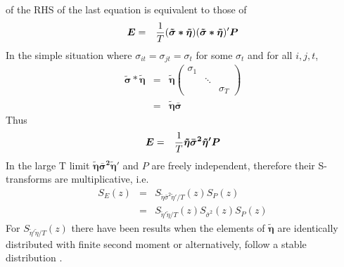 \documentclass{article}
\begin{document}
of the RHS of the last equation is equivalent to those of
\begin{eqnarray*}
  \bm E &=& {1 \over T} (\bm{\tilde{\sigma} * \tilde{\eta}}) (\bm{\tilde{\sigma}
    * \tilde{\eta}})' \bm P \\
\end{eqnarray*}
In the simple situation where $\sigma_{it} =
\sigma_{jt} = \sigma_t$ for some $\sigma_t$ and for all $i, j, t$,
\begin{eqnarray*}
  \bm{\tilde \sigma * \tilde \eta} &=& \bm{\tilde \eta}
  \begin{pmatrix}
    \sigma_1 &        & \\
        & \ddots & \\
        &        & \sigma_T
  \end{pmatrix} \\
  &=& \bm{\tilde \eta \bar \sigma}
\end{eqnarray*}
Thus
\begin{eqnarray}\label{eq:E_def}
  \bm E &=& {1 \over T}\bm{\tilde \eta \bar \sigma^2 \tilde \eta' P}
\end{eqnarray}
In the large T limit $\bm{\tilde \eta \bar \sigma^2 \tilde \eta'}$ and $P$ are
freely independent, therefore their S-transforms are multiplicative,
i.e.
\begin{eqnarray}
  S_E(z) &=& S_{\tilde \eta \bar \sigma^2 \tilde \eta'/T}(z) S_P(z)
  \nonumber \\
  &=& S_{\tilde \eta' \tilde \eta /T}(z) S_{\bar \sigma^2}(z) S_P(z) \label{eq:S_E}
\end{eqnarray}
For $S_{\tilde \eta' \tilde \eta /T}(z)$ there have been results when
the elements of $\bm{\tilde \eta}$ are identically distributed with finite
second moment \cite{burda2011} or alternatively, follow a stable
distribution \cite{politi2010}.
\end{document}
